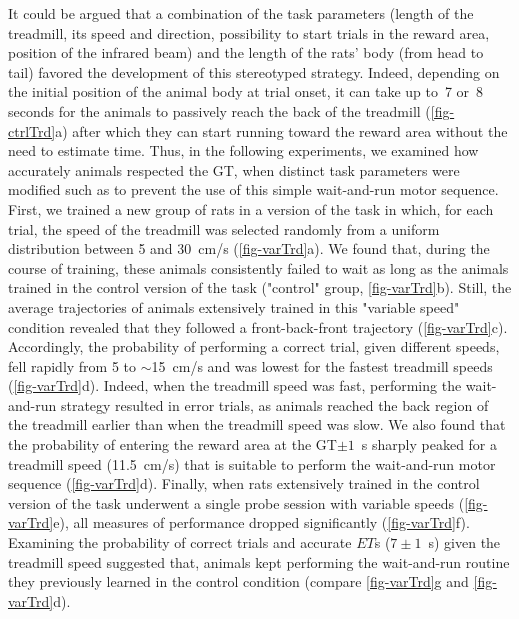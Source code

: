 \par

It could be argued that a combination of the task parameters (length of the treadmill, its speed and direction, possibility to start trials in the reward area, position of the infrared beam) and the length of the rats' body (from head to tail) favored the development of this stereotyped strategy.
Indeed, depending on the initial position of the animal body at trial onset, it can take up to~7 or~8 seconds for the animals to passively reach the back of the treadmill (\autoref{fig-ctrlTrd}a) after which they can start running toward the reward area without the need to estimate time.
Thus, in the following experiments, we examined how accurately animals respected the GT, when distinct task parameters were modified such as to prevent the use of this simple wait-and-run motor sequence.
First, we trained a new group of rats in a version of the task in which, for each trial, the speed of the treadmill was selected randomly from a uniform distribution between 5 and 30~cm/s (\autoref{fig-varTrd}a).
We found that, during the course of training, these animals consistently failed to wait as long as the animals trained in the control version of the task ("control" group, \autoref{fig-varTrd}b).
Still, the average trajectories of animals extensively trained in this "variable speed" condition revealed that they followed a front-back-front trajectory (\autoref{fig-varTrd}c).
Accordingly, the probability of performing a correct trial, given different speeds, fell rapidly from 5 to $\sim$15~cm/s and was lowest for the fastest treadmill speeds (\autoref{fig-varTrd}d).
Indeed, when the treadmill speed was fast, performing the wait-and-run strategy resulted in error trials, as animals reached the back region of the treadmill earlier than when the treadmill speed was slow.
We also found that the probability of entering the reward area at the GT$\pm 1$~s sharply peaked for a treadmill speed (11.5~cm/s) that is suitable to perform the wait-and-run motor sequence (\autoref{fig-varTrd}d).
Finally, when rats extensively trained in the control version of the task underwent a single probe session with variable speeds (\autoref{fig-varTrd}e), all measures of performance dropped significantly (\autoref{fig-varTrd}f).
Examining the probability of correct trials and accurate $ET$s ($7\pm 1$~s) given the treadmill speed suggested that, animals kept performing the wait-and-run routine they previously learned in the control condition (compare \autoref{fig-varTrd}g and \autoref{fig-varTrd}d).
\par
